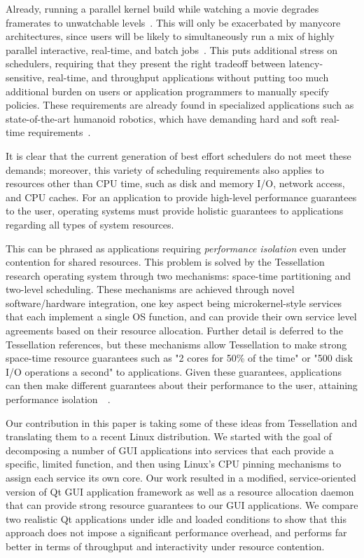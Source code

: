 \documentclass[letterpaper,twocolumn,11pt]{article}
\begin{document}
Already, running a parallel kernel build while watching a movie degrades framerates to unwatchable levels~\cite{DBLP:conf/osdi/YangLBKM08}. This will only be exacerbated by manycore architectures, since users will be likely to simultaneously run a mix of highly parallel interactive, real-time, and batch jobs~\cite{liu09tessellation}. This puts additional stress on schedulers, requiring that they present the right tradeoff between latency-sensitive, real-time, and throughput applications without putting too much additional burden on users or application programmers to manually specify policies. These requirements are already found in specialized applications such as state-of-the-art humanoid robotics, which have demanding hard and soft real-time requirements~\cite{Yoo:2009:RPD:1618617.1618723, Kaneko04humanoidrobot}. 

It is clear that the current generation of best effort schedulers do not meet these demands; moreover, this variety of scheduling requirements also applies to resources other than CPU time, such as disk and memory I/O, network access, and CPU caches. For an application to provide high-level performance guarantees to the user, operating systems must provide holistic guarantees to applications regarding all types of system resources.

This can be phrased as applications requiring \textit{performance isolation} even under contention for shared resources. This problem is solved by the Tessellation research operating system through two mechanisms: space-time partitioning and two-level scheduling. These mechanisms are achieved through novel software/hardware integration, one key aspect being microkernel-style services that each implement a single OS function, and can provide their own service level agreements based on their resource allocation. Further detail is deferred to the Tessellation references, but these mechanisms allow Tessellation to make strong space-time resource guarantees such as "2 cores for 50\% of the time" or "500 disk I/O operations a second" to applications. Given these guarantees, applications can then make different guarantees about their performance to the user, attaining performance isolation~\cite{liu09tessellation}~\cite{tessellation-hotpar10}.

Our contribution in this paper is taking some of these ideas from Tessellation and translating them to a recent Linux distribution. We started with the goal of decomposing a number of GUI applications into services that each provide a specific, limited function, and then using Linux's CPU pinning mechanisms to assign each service its own core. Our work resulted in a modified, service-oriented version of Qt GUI application framework as well as a resource allocation daemon that can provide strong resource guarantees to our GUI applications. We compare two realistic Qt applications under idle and loaded conditions to show that this approach does not impose a significant performance overhead, and performs far better in terms of throughput and interactivity under resource contention.
\end{document}
